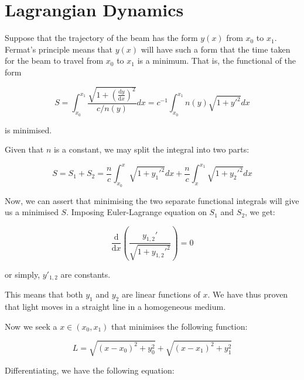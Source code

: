 \documentclass[12pt]{article}
\begin{document}



\pagebreak
\section*{Lagrangian Dynamics}



Suppose that the trajectory of the beam has the form $y(x)$ from $x_{0}$ to $x_{1}$. Fermat's principle means that $y(x)$ will have such a form that the time taken for the beam to travel from $x_{0}$ to $x_{1}$ is a minimum. That is, the functional of the form

\begin{equation}
    S = \int_{x_{0}}^{x_{1}} \frac{\sqrt{1 + \left( \frac{\mathrm{d}y}{\mathrm{d}x} \right)^{2}}}{c/n(y)} dx = c^{-1} \int_{x_{0}}^{x_{1}} n(y) \sqrt{1 + y'^{2}} dx
\end{equation}

is minimised.

Given that $n$ is a constant, we may split the integral into two parts:

\begin{equation}
    S = S_{1} + S_{2} = \frac{n}{c} \int_{x_{0}}^{x} \sqrt{1 + y_{1}'^{2}} dx + \frac{n}{c} \int_{x}^{x_{1}} \sqrt{1 + y_{2}'^{2}} dx
\end{equation}

Now, we can assert that minimising the two separate functional integrals will give us a minimised $S$. Imposing Euler-Lagrange equation on $S_{1}$ and $S_{2}$, we get:

\begin{equation}
    \frac{\mathrm{d}}{\mathrm{d}x} \left( \frac{y_{1, 2}'}{\sqrt{1 + y_{1, 2}'^{2}}} \right) = 0
\end{equation}

or simply, $y'_{1, 2}$ are constants.

This means that both $y_{1}$ and $y_{2}$ are linear functions of $x$. We have thus proven that light moves in a straight line in a homogeneous medium.

Now we seek a $x \in (x_{0}, x_{1})$ that minimises the following function:

\begin{equation}
    L = \sqrt{(x - x_{0})^{2} + y_{0}^{2}} + \sqrt{(x - x_{1})^{2} + y_{1}^{2}}
\end{equation}

Differentiating, we have the following equation:
\end{document}
